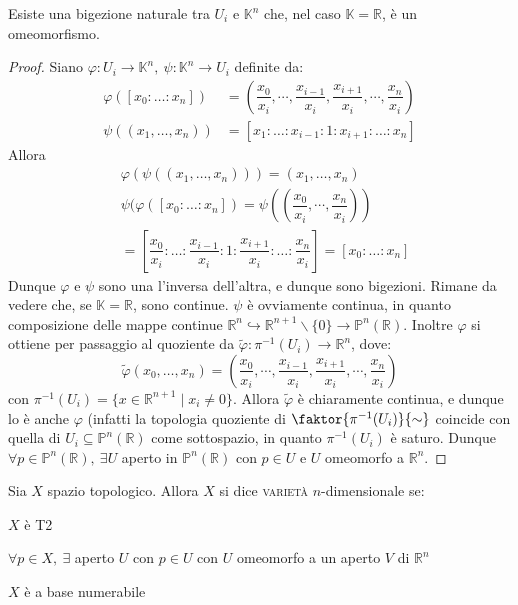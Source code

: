 \begin{prop}
Esiste una bigezione naturale tra $U_i$ e $\mathbb{K}^n$ che, nel caso $\mathbb{K}=\mathbb{R}$, è un omeomorfismo.
\end{prop}
\begin{proof}
Siano $\varphi :U_i \rightarrow \mathbb{K}^n,\ \psi :\mathbb{K}^n \rightarrow U_i$ definite da:
\begin{align*}
\varphi ([x_0: \dots :x_n]) &= \left( \dfrac{x_0}{x_i},\cdots,\dfrac{x_{i-1}}{x_i},\dfrac{x_{i+1}}{x_i},\cdots,\dfrac{x_n}{x_i}\right) \\
\psi ((x_1,\dots,x_n)) &=[x_1: \dots :x_{i-1}:1:x_{i+1}: \dots :x_n]
\end{align*}
Allora
\begin{align*}
&\varphi (\psi ((x_1,\dots,x_n)))=(x_1,\dots,x_n) \\
&\psi (\varphi ([x_0: \dots :x_n])=\psi \left( \left( \dfrac{x_0}{x_i},\cdots,\dfrac{x_n}{x_i}\right) \right) \\&=\left[\dfrac{x_0}{x_i}: \dots :\dfrac{x_{i-1}}{x_i}:1:\dfrac{x_{i+1}}{x_i}: \dots :\dfrac{x_n}{x_i}\right]=[x_0: \dots :x_n]
\end{align*}
Dunque $\varphi$ e $\psi$ sono una l'inversa dell'altra, e dunque sono bigezioni. Rimane da vedere che, se $\mathbb{K}=\mathbb{R}$, sono continue. $\psi$ è ovviamente continua, in quanto composizione delle mappe continue $\mathbb{R}^n \hookrightarrow \mathbb{R}^{n+1} \smallsetminus \{0\} \rightarrow \mathbb{P}^n(\mathbb{R})$. Inoltre $\varphi$ si ottiene per passaggio al quoziente da $\tilde{\varphi} : \pi ^{-1} (U_i) \rightarrow \mathbb{R}^n$, dove:
$$\tilde{\varphi}(x_0,\dots,x_n)=\left( \dfrac{x_0}{x_i},\cdots,\dfrac{x_{i-1}}{x_i},\dfrac{x_{i+1}}{x_i},\cdots,\dfrac{x_n}{x_i}\right)$$
con $\pi ^{-1}(U_i)=\{x \in \mathbb{R}^{n+1} \mid x_i \neq 0\}$. Allora $\tilde{\varphi}$ è chiaramente continua, e dunque lo è anche $\varphi$ (infatti la topologia quoziente di $\faktor {\pi ^{-1} (U_i)}{\sim}$ coincide con quella di $U_i \subseteq \mathbb{P}^n (\mathbb{R})$ come sottospazio, in quanto $\pi ^{-1} (U_i)$ è saturo. Dunque $\forall p \in \mathbb{P}^n (\mathbb{R}),\ \exists U$ aperto in $\mathbb{P}^n (\mathbb{R})$ con $p \in U$ e $U$ omeomorfo a $\mathbb{R}^n$.
\end{proof}

\begin{defn}
Sia $X$ spazio topologico. Allora $X$ si dice \textsc{varietà} $n$-dimensionale se:
\begin{nlist}
\item $X$ è T2
\item $\forall p \in X,\ \exists$ aperto $U$ con $p \in U$ con $U$ omeomorfo a un aperto $V$ di $\mathbb{R}^n$
\item $X$ è a base numerabile
\end{nlist}
\end{defn}

